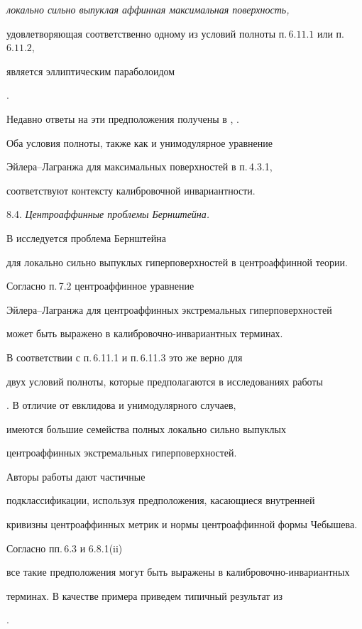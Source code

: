 {\it локально сильно выпуклая аффинная максимальная поверхность,

удовлетворяющая соответственно одному из условий полноты п.\,$6.11.1$ или п.\,$6.11.2$,

является эллиптическим параболоидом}.

Недавно ответы на эти предположения получены в \cite{TRU-W}, \cite{LI-J}.

Оба условия полноты, также как и унимодулярное уравнение

Эйлера--Лагранжа для максимальных поверхностей в п.\,4.3.1,

соответствуют контексту калибровочной инвариантности.

\medskip



8.4. {\it Центроаффинные проблемы Бернштейна.}

В \cite {LI-LI-S} исследуется проблема Бернштейна

для локально сильно выпуклых гиперповерхностей в центроаффинной теории.

Согласно п.\,7.2 центроаффинное уравнение

Эйлера--Лагранжа для центроаффинных экстремальных гиперповерхностей

может быть выражено в калибровочно-инвариантных терминах.

В соответствии с п.\,6.11.1 и п.\,6.11.3 это же верно для

двух условий полноты, которые предполагаются в исследованиях работы

\cite {LI-LI-S}. В отличие от евклидова и унимодулярного случаев,

имеются большие семейства полных локально сильно выпуклых

центроаффинных экстремальных гиперповерхностей.

Авторы работы \cite{LI-LI-S} дают частичные

подклассификации, используя предположения, касающиеся внутренней

кривизны центроаффинных метрик и нормы центроаффинной формы Чебышева.

Согласно пп.\,6.3 и 6.8.1(ii)

все такие предположения могут быть выражены в калибровочно-инвариантных 

терминах. В качестве примера приведем типичный результат из

\cite{LI-LI-S}.

\medskip



